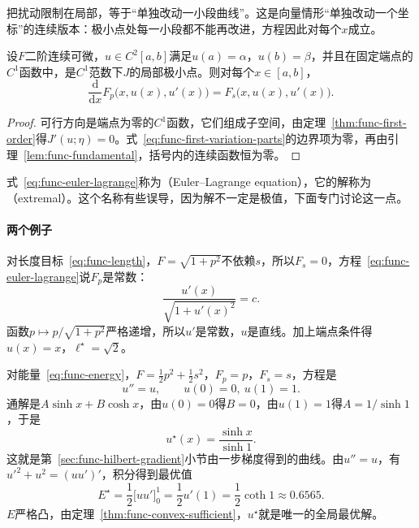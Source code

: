 把扰动限制在局部，等于“单独改动一小段曲线”。这是向量情形“单独改动一个坐标”的连续版本：极小点处每一小段都不能再改进，方程因此对每个$x$成立。

\begin{theorem}
\label{thm:func-euler-lagrange}
设$F$二阶连续可微，$u\in C^2[a,b]$满足$u(a)=\alpha$，$u(b)=\beta$，并且在固定端点的$C^1$函数中，是$C^1$范数下$J$的局部极小点。则对每个$x\in[a,b]$，
\begin{equation}
 \frac{\mathrm{d}}{\mathrm{d}x}F_p\bigl(x,u(x),u'(x)\bigr)=F_s\bigl(x,u(x),u'(x)\bigr).
 \label{eq:func-euler-lagrange}
\end{equation}
\end{theorem}

\begin{proof}
可行方向是端点为零的$C^1$函数，它们组成子空间，由定理~\ref{thm:func-first-order}得$J'(u;\eta)=0$。式~\eqref{eq:func-first-variation-parts}的边界项为零，再由引理~\ref{lem:func-fundamental}，括号内的连续函数恒为零。
\end{proof}

式~\eqref{eq:func-euler-lagrange}称为（Euler--Lagrange equation），它的解称为（extremal）。这个名称有些误导，因为解不一定是极值，下面专门讨论这一点。

\paragraph{两个例子}
对长度目标~\eqref{eq:func-length}，$F=\sqrt{1+p^2}$不依赖$s$，所以$F_s=0$，方程~\eqref{eq:func-euler-lagrange}说$F_p$是常数：
\[
 \frac{u'(x)}{\sqrt{1+u'(x)^2}}=c.
\]
函数$p\mapsto p/\sqrt{1+p^2}$严格递增，所以$u'$是常数，$u$是直线。加上端点条件得$u(x)=x$，$\ell^\star=\sqrt2$。

对能量~\eqref{eq:func-energy}，$F=\frac12p^2+\frac12s^2$，$F_p=p$，$F_s=s$，方程是
\begin{equation}
 u''=u,\qquad u(0)=0,\ u(1)=1.
 \label{eq:func-energy-el}
\end{equation}
通解是$A\sinh x+B\cosh x$，由$u(0)=0$得$B=0$，由$u(1)=1$得$A=1/\sinh1$，于是
\begin{equation}
 u^\star(x)=\frac{\sinh x}{\sinh1}.
 \label{eq:func-energy-solution}
\end{equation}
这就是第~\ref{sec:func-hilbert-gradient}小节由一步梯度得到的曲线。由$u''=u$，有$u'^2+u^2=(uu')'$，积分得到最优值
\begin{equation}
 E^\star=\frac12\bigl[uu'\bigr]_0^1=\frac12u'(1)=\frac12\coth1\approx0.6565.
 \label{eq:func-energy-value}
\end{equation}
$E$严格凸，由定理~\ref{thm:func-convex-sufficient}，$u^\star$就是唯一的全局最优解。

